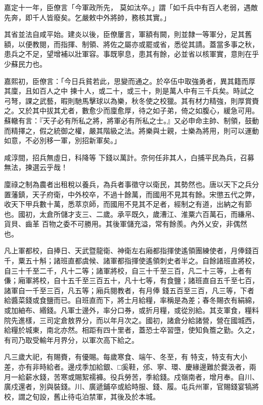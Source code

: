 \begin{pinyinscope}
 嘉定十一年，臣僚言「今軍政所先，
 莫如汰卒。」謂「如千兵中有百人老弱，遇敵先奔，即千人皆廢矣。乞嚴敕中外將帥，務核其實。」



 其省並法自咸平始。建炎以後，臣僚屢言，軍額有闕，則並隸一等軍分，足其舊額，以便教閱，而指揮、制領、將佐之屬亦或罷或省，悉從其請。蓋當多事之秋，患兵之不足，望增補以壯軍容。事既寧息，患其有餘，必並省以核軍實，意則在乎少蘇民力也。



 嘉熙初，臣僚言：「今日兵貧若此，思變而通之。於卒伍中取強勇者，異其籍而厚其廩，且如百人之中
 揀十人，或二十，或三十，則是萬人中有三千兵矣。時試之弓弩，課之武藝，暇則馳馬擊球以為樂，秋冬使之校獵。其有材力精強，則厚賞賚之。又於其中拔其尤者，數愈少而廩愈厚，待之如子弟，倚之如腹心，緩急可用。蘇轍有言：『天子必有所私之將，將軍必有所私之士。』又必申命主帥、制領，鼓動而精擇之，假之統御之權，嚴其階級之法。將樂與士親，士樂為將用，則可以運動如意，不必別移一軍，別招新軍矣。」



 咸淳間，招兵無虛日，科降等
 下錢以萬計。奈何任非其人，白捕平民為兵，召募無法，揀選云乎哉！



 廩祿之制為農者出租稅以養兵，為兵者事徵守以衛民，其勢然也。唐以天下之兵分置藩鎮，天子府衛，中外校卒，不過十餘萬，而國用不見其有餘。宋懲五代之弊，收天下甲兵數十萬，悉萃京師，而國用不見其不足者，經制之有道，出納之有節也。國初，太倉所儲才支三、二歲。承平既久，歲漕江、淮粟六百萬石，而縑帛、貨貝、齒革
 百物之委不可勝用。其後軍儲充溢，常有餘羨。內外乂安，非偶然也。



 凡上軍都校，自捧日、天武暨龍衛、神衛左右廂都指揮使遙領團練使者，月俸錢百千，粟五十斛；諸班直都虞候、諸軍都指揮使遙領刺史者半之。自餘諸班直將校，自三十千至二千，凡十二等；諸軍將校，自三十千至三百，凡二十三等，上者有傔；廂軍將校，自十五千至三百五十，凡十七等，有食鹽；諸班直自五千至七百，諸軍自一千至三百，凡五等；廂兵閱教者，有月俸
 錢五百至三百，凡三等，下者給醬菜錢或食鹽而已。自班直而下，將士月給糧，率稱是為差；春冬賜衣有絹綿，或加紬布、緡錢。凡軍士邊外，率分口券，或折月糧，或從別給。其支軍食，糧料院先進樣，三司定倉敖界分，而以年月次之。國初，諸倉分給諸營，營在國城西，給糧於城東，南北亦然。相距有四十里者，蓋恐士卒習墮，使知負簷之勤。久之，有司乃取受輸年月界分，以軍次高下給之。



 凡三歲大祀，有賜賚，有優賜。每歲寒食、端午、冬至，有
 特支，特支有大小差，亦有非時給者。邊戍季加給銀、□奚鞋，邠、寧、環、慶緣邊難於爨汲者，兩月一給薪水錢，苦寒或賜絮襦褲。役兵勞苦，季給錢。戍嶺南者，增月奉。自川、廣戍還者，別與裝錢。川、廣遞鋪卒或給時服、錢、履。屯兵州軍，官賜錢宴犒將校，謂之旬設，舊止待屯泊禁軍，其後及於本城。




\end{pinyinscope}
